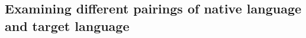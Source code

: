 


\subsection{Examining different pairings of native language and target language}\label{dis-limitation-distance}

